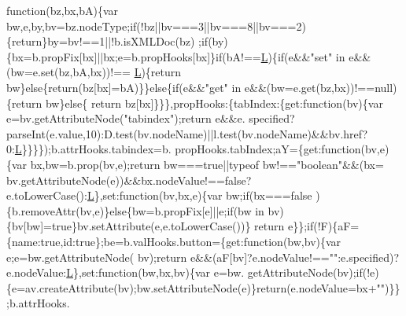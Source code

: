 \begin{DoxyCode}
{      function}(bz,bx,bA)\{var bw,e,by,bv=bz.nodeType;\textcolor{keywordflow}{if}(!bz||bv===3||bv===8||bv===2)\{\textcolor{keywordflow}{return}\}by=bv!==1||!b.isXMLDoc(bz)
      ;\textcolor{keywordflow}{if}(by)\{bx=b.propFix[bx]||bx;e=b.propHooks[bx]\}\textcolor{keywordflow}{if}(bA!==\hyperlink{jquery_8js_a38ee4c0b5f4fe2a18d0c783af540d253}{L})\{\textcolor{keywordflow}{if}(e&&\textcolor{stringliteral}{"set"} in e&&(bw=e.set(bz,bA,bx))!==
      \hyperlink{jquery_8js_a38ee4c0b5f4fe2a18d0c783af540d253}{L})\{\textcolor{keywordflow}{return} bw\}\textcolor{keywordflow}{else}\{\textcolor{keywordflow}{return}(bz[bx]=bA)\}\}\textcolor{keywordflow}{else}\{\textcolor{keywordflow}{if}(e&&\textcolor{stringliteral}{"get"} in e&&(bw=e.get(bz,bx))!==null)\{\textcolor{keywordflow}{return} bw\}\textcolor{keywordflow}{else}\{\textcolor{keywordflow}{
      return} bz[bx]\}\}\},propHooks:\{tabIndex:\{\textcolor{keyword}{get}:\textcolor{keyword}{function}(bv)\{var e=bv.getAttributeNode(\textcolor{stringliteral}{"tabindex"});\textcolor{keywordflow}{return} e&&e.
      specified?parseInt(e.value,10):D.test(bv.nodeName)||l.test(bv.nodeName)&&bv.href?0:\hyperlink{jquery_8js_a38ee4c0b5f4fe2a18d0c783af540d253}{L}\}\}\}\});b.attrHooks.tabindex=b.
      propHooks.tabIndex;aY=\{\textcolor{keyword}{get}:\textcolor{keyword}{function}(bv,e)\{var bx,bw=b.prop(bv,e);\textcolor{keywordflow}{return} bw===\textcolor{keyword}{true}||typeof bw!==\textcolor{stringliteral}{"boolean"}&&(bx=
      bv.getAttributeNode(e))&&bx.nodeValue!==\textcolor{keyword}{false}?e.toLowerCase():\hyperlink{jquery_8js_a38ee4c0b5f4fe2a18d0c783af540d253}{L}\},set:\textcolor{keyword}{function}(bv,bx,e)\{var bw;\textcolor{keywordflow}{if}(bx===\textcolor{keyword}{false}
      )\{b.removeAttr(bv,e)\}\textcolor{keywordflow}{else}\{bw=b.propFix[e]||e;\textcolor{keywordflow}{if}(bw in bv)\{bv[bw]=\textcolor{keyword}{true}\}bv.setAttribute(e,e.toLowerCase())\}\textcolor{keywordflow}{
      return} e\}\};\textcolor{keywordflow}{if}(!F)\{aF=\{name:\textcolor{keyword}{true},\textcolor{keywordtype}{id}:\textcolor{keyword}{true}\};be=b.valHooks.button=\{\textcolor{keyword}{get}:\textcolor{keyword}{function}(bw,bv)\{var e;e=bw.getAttributeNode(
      bv);\textcolor{keywordflow}{return} e&&(aF[bv]?e.nodeValue!==\textcolor{stringliteral}{""}:e.specified)?e.nodeValue:\hyperlink{jquery_8js_a38ee4c0b5f4fe2a18d0c783af540d253}{L}\},set:\textcolor{keyword}{function}(bw,bx,bv)\{var e=bw.
      getAttributeNode(bv);\textcolor{keywordflow}{if}(!e)\{e=av.createAttribute(bv);bw.setAttributeNode(e)\}\textcolor{keywordflow}{return}(e.nodeValue=bx+\textcolor{stringliteral}{""})\}\};b.attrHooks.

\end{DoxyCode}
